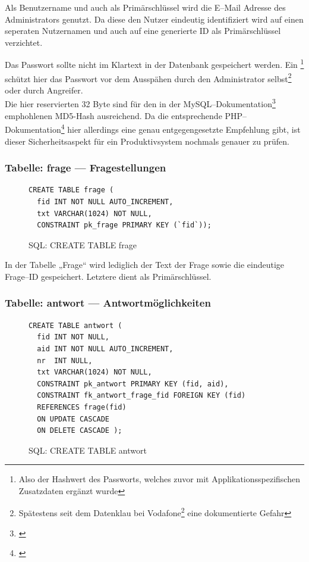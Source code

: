 Als Benutzername und auch als Primärschlüssel wird die E--Mail Adresse des Administrators genutzt. Da diese den Nutzer eindeutig identifiziert wird auf einen seperaten Nutzernamen und auch auf eine generierte ID als Primärschlüssel verzichtet.

Das Passwort sollte nicht im Klartext in der Datenbank gespeichert werden. Ein \footnote{Also der Hashwert des Passworts, welches zuvor mit Applikationsspezifischen Zusatzdaten ergänzt wurde} schützt hier das Passwort vor dem Ausspähen durch den Administrator selbst\footnote{Spätestens seit dem Datenklau bei Vodafone\footnote{\cite{vodafone}} eine dokumentierte Gefahr} oder durch Angreifer.\\
Die hier reservierten 32 Byte sind für den in der MySQL--Dokumentation\footnote{\cite{mysql:md5}} emphohlenen MD5-Hash ausreichend. Da die entsprechende PHP--Dokumentation\footnote{\cite{php:md5}} hier allerdings eine genau entgegengesetzte Empfehlung gibt, ist dieser Sicherheitsaspekt für ein Produktivsystem nochmals genauer zu prüfen.

\subsubsection{Tabelle: frage --- Fragestellungen}
\begin{figure}[H]
\begin{spacing}{1.0}
\begin{verbatim}
CREATE TABLE frage (
  fid INT NOT NULL AUTO_INCREMENT,
  txt VARCHAR(1024) NOT NULL,
  CONSTRAINT pk_frage PRIMARY KEY (`fid`));
\end{verbatim}
\caption{SQL: CREATE TABLE frage}
\label{sql:tblfrage}
\end{spacing}
\end{figure}

In der Tabelle „Frage“ wird lediglich der Text der Frage sowie die eindeutige Frage--ID gespeichert. Letztere dient als Primärschlüssel.

\subsubsection{Tabelle: antwort --- Antwortmöglichkeiten}
\begin{figure}[H]
\begin{spacing}{1.0}
\begin{verbatim}
CREATE TABLE antwort (
  fid INT NOT NULL, 
  aid INT NOT NULL AUTO_INCREMENT,
  nr  INT NULL,
  txt VARCHAR(1024) NOT NULL,
  CONSTRAINT pk_antwort PRIMARY KEY (fid, aid),
  CONSTRAINT fk_antwort_frage_fid FOREIGN KEY (fid) 
  REFERENCES frage(fid) 
  ON UPDATE CASCADE 
  ON DELETE CASCADE );
\end{verbatim}
\caption{SQL: CREATE TABLE antwort}
\label{sql:tblantwort}
\end{spacing}
\end{figure}

